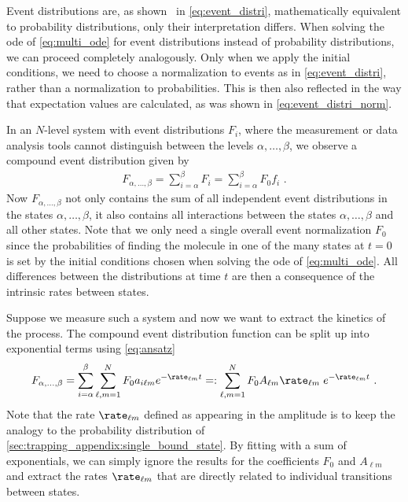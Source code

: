 Event distributions are, as shown \eg~in \cref{eq:event_distri}, mathematically equivalent to probability
distributions, only their interpretation differs. When solving the \gls{ode} of \cref{eq:multi_ode} for event
distributions instead of probability distributions, we can proceed completely analogously.  Only when we apply
the initial conditions, we need to choose a normalization to events as in \cref{eq:event_distri}, rather than
a normalization to probabilities. This is then also reflected in the way that expectation values are
calculated, as was shown in \cref{eq:event_distri_norm}.

In an $N$-level system with event distributions $F_i$, where the measurement or data analysis tools cannot
distinguish between the levels $\alpha,\dots,\beta$, we observe a compound event distribution given by
%
\begin{align*}
    F_{\alpha,\dots,\beta} = \sum_{i=\alpha}^{\beta} F_i
        = \sum_{i=\alpha}^{\beta} F_{0}f_i
    \text{ .}
\end{align*}
%
Now $F_{\alpha,\dots,\beta}$ not only contains the sum of all independent event distributions in the states
$\alpha,\dots,\beta$, it also contains all interactions between the states $\alpha,\dots,\beta$ and all other
states. Note that we only need a single overall event normalization $F_0$ since the probabilities of finding
the molecule in one of the many states at $t=0$ is set by the initial conditions chosen when solving the
\gls{ode} of \cref{eq:multi_ode}. All differences between the distributions at time $t$ are then a consequence
of the intrinsic rates between states.

Suppose we measure such a system and now we want to extract the kinetics of the process. The compound event
distribution function can be split up into exponential terms using \cref{eq:ansatz}
%
\begin{align}\label{eq:compound_distri}
    F_{\alpha,\dots,\beta} =
        \sum_{i=\alpha}^\beta \sum_{\ell, m = 1}^N
            F_{0} a_{i\ell m} e^{- \rate_{\ell m} t}
    =: \sum_{\ell, m=1}^N F_{0} A_{\ell m} \rate_{\ell m} \;e^{-\rate_{\ell m} t}
    \text{ .}
\end{align}
%
Note that the rate $\rate_{\ell m}$ defined as appearing in the amplitude is to keep the analogy to the
probability distribution of \cref{sec:trapping_appendix:single_bound_state}.  By fitting with a sum of
exponentials, we can simply ignore the results for the coefficients $F_{0}$ and $A_{\ell m}$ and extract the
rates $\rate_{\ell m}$ that are directly related to individual transitions between states.

